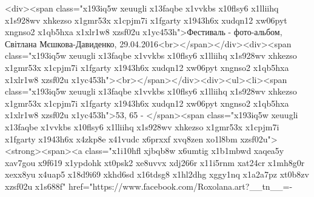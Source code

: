 <div><span class="x193iq5w xeuugli x13faqbe x1vvkbs x10flsy6 x1lliihq x1s928wv xhkezso x1gmr53x x1cpjm7i x1fgarty x1943h6x xudqn12 xw06pyt xngnso2 x1qb5hxa x1xlr1w8 xzsf02u x1yc453h">Фестиваль - фото-альбом, Світлана Мєшкова-Давиденко, 29.04.2016<br></span></div><div><span class="x193iq5w xeuugli x13faqbe x1vvkbs x10flsy6 x1lliihq x1s928wv xhkezso x1gmr53x x1cpjm7i x1fgarty x1943h6x xudqn12 xw06pyt xngnso2 x1qb5hxa x1xlr1w8 xzsf02u x1yc453h"><br></span></div><div><ul><li><span class="x193iq5w xeuugli x13faqbe x1vvkbs x10flsy6 x1lliihq x1s928wv xhkezso x1gmr53x x1cpjm7i x1fgarty x1943h6x xudqn12 xw06pyt xngnso2 x1qb5hxa x1xlr1w8 xzsf02u x1yc453h">53, 65 - </span><span class="x193iq5w xeuugli x13faqbe x1vvkbs x10flsy6 x1lliihq x1s928wv xhkezso x1gmr53x x1cpjm7i x1fgarty x1943h6x x4zkp8e x41vudc x6prxxf xvq8zen xo1l8bm xzsf02u"> <strong><span><a class="x1i10hfl xjbqb8w x6umtig x1b1mbwd xaqea5y xav7gou x9f619 x1ypdohk xt0psk2 xe8uvvx xdj266r x11i5rnm xat24cr x1mh8g0r xexx8yu x4uap5 x18d9i69 xkhd6sd x16tdsg8 x1hl2dhg xggy1nq x1a2a7pz xt0b8zv xzsf02u x1s688f" href="https://www.facebook.com/Roxolana.art?__tn__=-%